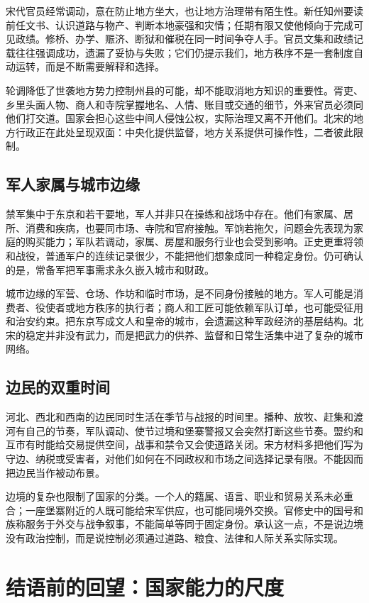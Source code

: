 宋代官员经常调动，意在防止地方坐大，也让地方治理带有陌生性。新任知州要读前任文书、认识道路与物产、判断本地豪强和灾情；任期有限又使他倾向于完成可见政绩。修桥、办学、赈济、断狱和催税在同一时间争夺人手。官员文集和政绩记载往往强调成功，遗漏了妥协与失败；它们仍提示我们，地方秩序不是一套制度自动运转，而是不断需要解释和选择。

轮调降低了世袭地方势力控制州县的可能，却不能取消地方知识的重要性。胥吏、乡里头面人物、商人和寺院掌握地名、人情、账目或交通的细节，外来官员必须同他们打交道。国家会担心这些中间人侵蚀公权，实际治理又离不开他们。北宋的地方行政正在此处呈现双面：中央化提供监督，地方关系提供可操作性，二者彼此限制。

\subsection{军人家属与城市边缘}

禁军集中于东京和若干要地，军人并非只在操练和战场中存在。他们有家属、居所、消费和疾病，也要同市场、寺院和官府接触。军饷若拖欠，问题会先表现为家庭的购买能力；军队若调动，家属、房屋和服务行业也会受到影响。正史更重将领和战役，普通军户的连续记录很少，不能把他们想象成同一种稳定身份。仍可确认的是，常备军把军事需求永久嵌入城市和财政。

城市边缘的军营、仓场、作坊和临时市场，是不同身份接触的地方。军人可能是消费者、役使者或地方秩序的执行者；商人和工匠可能依赖军队订单，也可能受征用和治安约束。把东京写成文人和皇帝的城市，会遗漏这种军政经济的基层结构。北宋的稳定并非没有武力，而是把武力的供养、监督和日常生活集中进了复杂的城市网络。

\subsection{边民的双重时间}

河北、西北和西南的边民同时生活在季节与战报的时间里。播种、放牧、赶集和渡河有自己的节奏，军队调动、使节过境和堡寨警报又会突然打断这些节奏。盟约和互市有时能给交易提供空间，战事和禁令又会使道路关闭。宋方材料多把他们写为守边、纳税或受害者，对他们如何在不同政权和市场之间选择记录有限。不能因而把边民当作被动布景。

边境的复杂也限制了国家的分类。一个人的籍属、语言、职业和贸易关系未必重合；一座堡寨附近的人既可能给宋军供应，也可能同境外交换。官修史中的国号和族称服务于外交与战争叙事，不能简单等同于固定身份。承认这一点，不是说边境没有政治控制，而是说控制必须通过道路、粮食、法律和人际关系实际实现。

\section{结语前的回望：国家能力的尺度}

